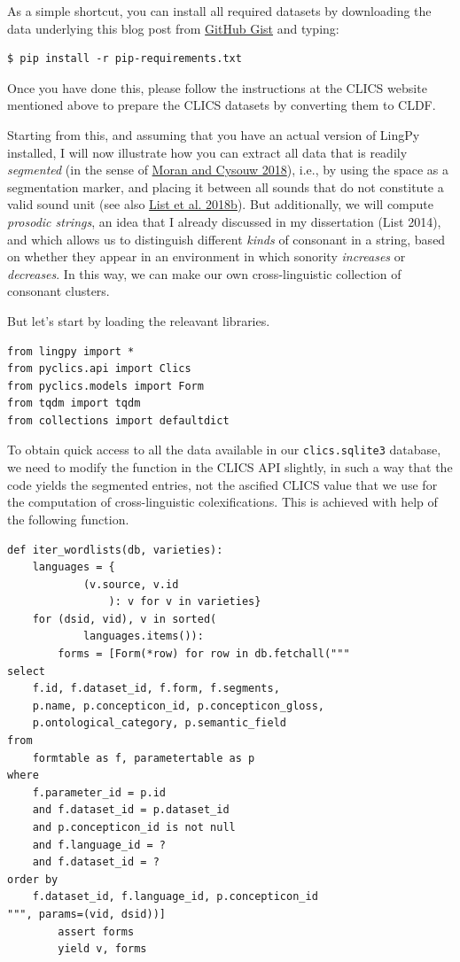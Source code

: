 \documentclass[
  a4paper,
  14pt,
  oneside,
  tablecaptionabove
]{scrbook}
\begin{document}
 As a simple shortcut, you can install all
required datasets by downloading the data underlying this blog post from
\href{https://gist.github.com/LinguList/1056960125ca79428b420257fa4b02eb}{GitHub
Gist} and typing:

\begin{lstlisting}[basicstyle=\small]
$ pip install -r pip-requirements.txt
\end{lstlisting}

Once you have done this, please follow the instructions at the CLICS
website mentioned above to prepare the CLICS datasets by converting them
to CLDF.

Starting from this, and assuming that you have an actual version of
LingPy installed, I will now illustrate how you can extract all data
that is readily \emph{segmented} (in the sense of
\href{http://bibliography.lingpy.org?key=Moran2018}{Moran and Cysouw
2018}), i.e., by using the space as a segmentation marker, and placing
it between all sounds that do not constitute a valid sound unit (see
also \href{http://bibliography.lingpy.org?key=List2018d}{List et al.
2018b}). But additionally, we will compute \emph{prosodic strings}, an
idea that I already discussed in my dissertation (List 2014), and which
allows us to distinguish different \emph{kinds} of consonant in a
string, based on whether they appear in an environment in which sonority
\emph{increases} or \emph{decreases}.  In this way, we can make our own
cross-linguistic collection of consonant clusters.

But let's start by loading the releavant libraries.

\begin{lstlisting}[basicstyle=\small]
from lingpy import *
from pyclics.api import Clics
from pyclics.models import Form
from tqdm import tqdm
from collections import defaultdict
\end{lstlisting}

To obtain quick access to all the data available in our
\lstinline!clics.sqlite3! database, we need to modify the function in
the CLICS API slightly, in such a way that the code yields the segmented
entries, not the ascified CLICS value that we use for the computation of
cross-linguistic colexifications. This is achieved with help of the
following function.

\begin{lstlisting}[basicstyle=\small]
def iter_wordlists(db, varieties):
    languages = {
            (v.source, v.id
                ): v for v in varieties}
    for (dsid, vid), v in sorted(
            languages.items()):
        forms = [Form(*row) for row in db.fetchall("""
select
    f.id, f.dataset_id, f.form, f.segments,
    p.name, p.concepticon_id, p.concepticon_gloss,
    p.ontological_category, p.semantic_field 
from
    formtable as f, parametertable as p
where
    f.parameter_id = p.id
    and f.dataset_id = p.dataset_id
    and p.concepticon_id is not null
    and f.language_id = ?
    and f.dataset_id = ?
order by
    f.dataset_id, f.language_id, p.concepticon_id
""", params=(vid, dsid))]
        assert forms
        yield v, forms
\end{lstlisting}
\end{document}
